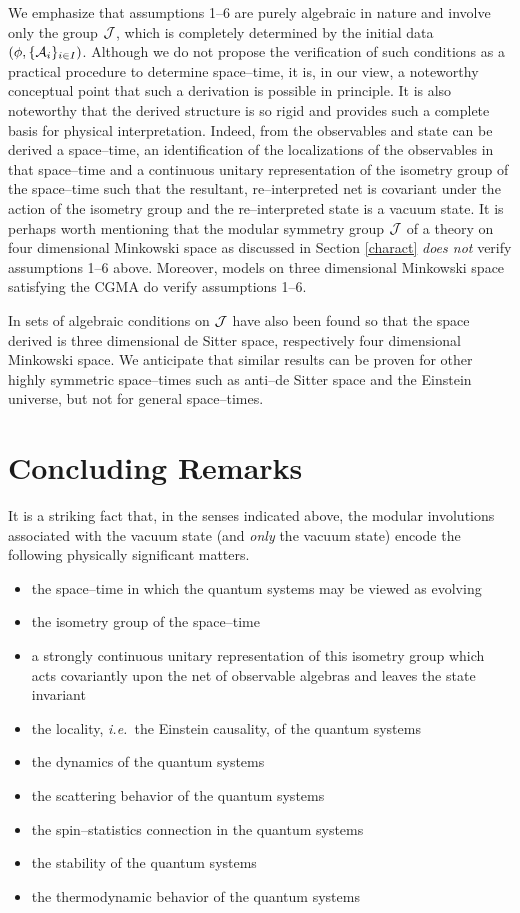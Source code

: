 \documentclass[12pt]{article}
\newcommand{\ie}{{\it i.e.\ }}
\def\inet{{\{\As_i\}_{i \in I}}}
\def\As{{\cal A}}
\def\Js{{\cal J}}
\begin{document}
     We emphasize that assumptions 1--6 are purely algebraic in nature
and involve only the group $\Js$, which is completely determined by
the initial data $(\phi,\inet)$. Although we do not propose the
verification of such conditions as a practical procedure to determine
space--time, it is, in our view, a noteworthy conceptual point that
such a derivation is possible in principle. It is also noteworthy that
the derived structure is so rigid and provides such a complete basis
for physical interpretation. Indeed, from the observables and state
can be derived a space--time, an identification of the localizations
of the observables in that space--time and a continuous unitary
representation of the isometry group of the space--time such that the
resultant, re--interpreted net is covariant under the action of the
isometry group and the re--interpreted state is a vacuum state. It is
perhaps worth mentioning that the modular symmetry group $\Js$ of a
theory on four dimensional Minkowski space as discussed in Section
\ref{charact} {\it does not} verify assumptions 1--6 above.  Moreover,
models on three dimensional Minkowski space satisfying the CGMA do
verify assumptions 1--6.

     In \cite{SuWh2,SuWh3,Wh} sets of algebraic conditions on $\Js$
have also been found so that the space derived is three dimensional
de Sitter space, respectively four dimensional Minkowski space.
We anticipate that similar results can be proven for other highly
symmetric space--times such as anti--de Sitter space and the 
Einstein universe, but not for general space--times.

\section{Concluding Remarks} \label{concl}

     It is a striking fact that, in the senses indicated above, the 
modular involutions associated with the vacuum state (and {\it only}
the vacuum state) encode the following physically significant
matters.

\begin{itemize}
\item the space--time in which the quantum systems may be viewed as evolving
\item the isometry group of the space--time
\item a strongly continuous unitary representation of this isometry group
which acts covariantly upon the net of observable algebras and leaves
the state invariant
\item the locality, \ie the Einstein causality, of the quantum systems
\item the dynamics of the quantum systems
\item the scattering behavior of the quantum systems
\item the spin--statistics connection in the quantum systems
\item the stability of the quantum systems
\item the thermodynamic behavior of the quantum systems
\end{itemize}     
 
\end{document}
